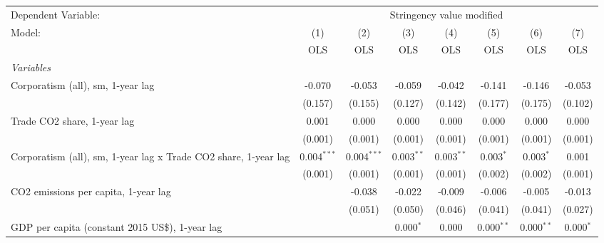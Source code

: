 
\begingroup
\centering
\begin{tabular}{lccccccc}
   \toprule
   Dependent Variable: & \multicolumn{7}{c}{Stringency value modified}\\
   Model:                                                          & (1)           & (2)           & (3)          & (4)          & (5)           & (6)           & (7)\\  
                                                                   &  OLS          & OLS           & OLS          & OLS          & OLS           & OLS           & OLS\\  
   \midrule
   \emph{Variables}\\
   Corporatism (all), sm, 1-year lag                               & -0.070        & -0.053        & -0.059       & -0.042       & -0.141        & -0.146        & -0.053\\   
                                                                   & (0.157)       & (0.155)       & (0.127)      & (0.142)      & (0.177)       & (0.175)       & (0.102)\\   
   Trade CO2 share, 1-year lag                                     & 0.001         & 0.000         & 0.000        & 0.000        & 0.000         & 0.000         & 0.000\\   
                                                                   & (0.001)       & (0.001)       & (0.001)      & (0.001)      & (0.001)       & (0.001)       & (0.001)\\   
   Corporatism (all), sm, 1-year lag x Trade CO2 share, 1-year lag & 0.004$^{***}$ & 0.004$^{***}$ & 0.003$^{**}$ & 0.003$^{**}$ & 0.003$^{*}$   & 0.003$^{*}$   & 0.001\\   
                                                                   & (0.001)       & (0.001)       & (0.001)      & (0.001)      & (0.002)       & (0.002)       & (0.001)\\   
   CO2 emissions per capita, 1-year lag                            &               & -0.038        & -0.022       & -0.009       & -0.006        & -0.005        & -0.013\\   
                                                                   &               & (0.051)       & (0.050)      & (0.046)      & (0.041)       & (0.041)       & (0.027)\\   
   GDP per capita (constant 2015 US\$), 1-year lag                 &               &               & 0.000$^{*}$  & 0.000        & 0.000$^{**}$  & 0.000$^{**}$  & 0.000$^{*}$\\   

\end{tabular}
